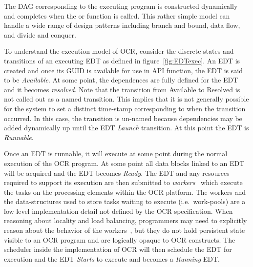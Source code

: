The DAG corresponding
to the executing program is constructed dynamically and completes when the
 or  function is called.
This rather simple model can handle a wide range of
design patterns including branch and bound, data flow, and divide and
conquer.
%
%

To understand the execution model of OCR, consider the discrete states and
transitions of an executing EDT as defined in figure~\ref{fig:EDTexec}.  An
EDT is created and once its GUID is available for use in API function, the EDT is said
to be \emph{Available}.  At some point, the dependences
are fully defined for the EDT and it becomes \emph{resolved}.
Note that the transition from Available to Resolved is not called out as a named transition.
This implies that it is not generally possible for the system to set a distinct time-stamp
corresponding to when the transition occurred.  In this case, the transition is un-named
because dependencies may be added dynamically up until the
EDT \emph{Launch} transition.  At this point the
EDT is \emph{Runnable}.

Once an EDT is runnable,  it will execute at some point during the normal execution
of the OCR program.   At some point all data blocks linked to an EDT will be acquired and the
EDT becomes \emph{Ready}. The
EDT  and any resources required
to support its execution are then submitted to
\emph{workers}~\cite{GBRS09} which execute the tasks on
the processing elements within the OCR platform. The workers and the
data-structures used to store tasks waiting to execute
(i.e.\ work-pools) are a low level implementation detail not defined by
the OCR specification. When reasoning about locality and load
balancing, programmers may need to explicitly reason about the
behavior of the workers~\cite{Chatterjee13}, but they do not hold
persistent state visible to an OCR program and are logically opaque to
OCR constructs. The scheduler inside the implementation of OCR
will then schedule the EDT for execution and the EDT  \emph{Starts} to execute and
becomes a \emph{Running} EDT.

%
%

